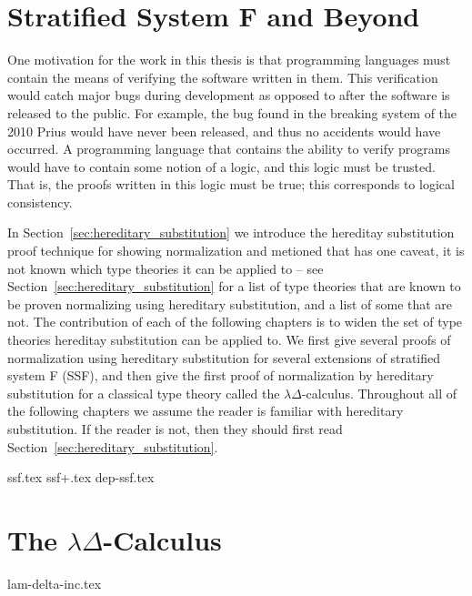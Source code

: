 \documentclass[phd,dedicationpage,ackpage,epigraphpage,figures]{uithesis}
\begin{document}
\chapter{Stratified System F and Beyond}
\label{chap:stratified_system_f_and_beyond}
One motivation for the work in this thesis is that programming
languages must contain the means of verifying the software written in
them.  This verification would catch major bugs during development as
opposed to after the software is released to the public.  For example,
the bug found in the breaking system of the 2010 Prius would have
never been released, and thus no accidents would have occurred.  A
programming language that contains the ability to verify programs
would have to contain some notion of a logic, and this logic must be
trusted.  That is, the proofs written in this logic must be true; this
corresponds to logical consistency.

In Section~\ref{sec:hereditary_substitution} we introduce the
hereditay substitution proof technique for showing normalization and
metioned that has one caveat, it is not known which type theories it
can be applied to -- see Section~\ref{sec:hereditary_substitution} for
a list of type theories that are known to be proven normalizing using
hereditary substitution, and a list of some that are not.  The
contribution of each of the following chapters is to widen the set of
type theories hereditay substitution can be applied to.  We first give
several proofs of normalization using hereditary substitution for
several extensions of stratified system F (SSF), and then give the
first proof of normalization by hereditary substitution for a
classical type theory called the $\lambda\Delta$-calculus.  Throughout
all of the following chapters we assume the reader is familiar with
hereditary substitution.  If the reader is not, then they should first
read Section~\ref{sec:hereditary_substitution}.

{ssf.tex}
{ssf+.tex}
{dep-ssf.tex}

\chapter{The $\lambda\Delta$-Calculus}
\label{chap:the_lambdadelta-calculus}
{lam-delta-inc.tex}
\end{document}
